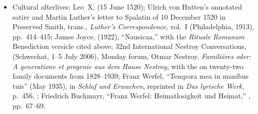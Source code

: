 {\begin{itemize}[leftmargin=1.1em,labelsep=0.35em,itemsep=0em,topsep=0.15em,parsep=0pt]
\item Cultural afterlives: Leo~X,
 (15 June 1520); Ulrich von Hutten's annotated satire and Martin
Luther's letter to Spalatin of 10 December 1520 in Preserved Smith, trans.,
\emph{Luther's Correspondence}, vol.~I (Philadelphia, 1913), pp.~414--415;
James Joyce,
 (1922),
``Nausicaa,'' with the \emph{Rituale Romanum} Benediction versicle cited
above; 32nd International Nestroy Conversations,
(Schwechat, 1--5 July 2006), Monday forum, Otmar Nestroy, \emph{Familiäres
oder: A generatione et progenie aus dem Hause Nestroy}, with the
on twenty-two family documents from 1828--1939; Franz Werfel,
``Tempora mea in manibus tuis'' (May 1935), in
\emph{Schlaf und Erwachen}, reprinted in \emph{Das lyrische Werk}, p.~456,
;
Friedrich Buchmayr, ``Franz Werfel: Heimatlosigkeit und Heimat,''
,
pp.~67--69.
\end{itemize}}
